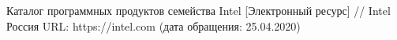 \begingroup 
\renewcommand{\section}[2]{\anonsection{Библиографический список}}
\begin{thebibliography}{00}

    Каталог программных продуктов семейства Intel
    [Электронный ресурс] //
    Intel Россия
    URL: https://intel.com
    (дата обращения: 25.04.2020)

\end{thebibliography}
\endgroup

\clearpage